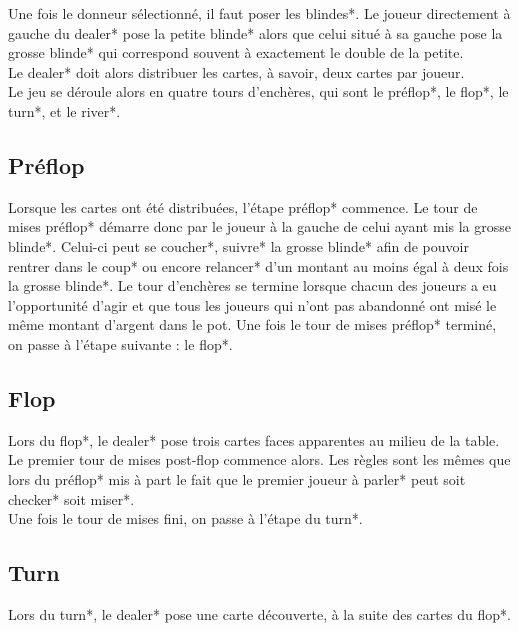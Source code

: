 \documentclass{report}
\begin{document}
Une fois le donneur sélectionné, il faut poser les blindes*. Le joueur directement à gauche du dealer* pose la petite blinde* alors que celui situé à sa gauche pose la grosse blinde* qui correspond souvent à exactement le double de la petite.\\

Le dealer* doit alors distribuer les cartes, à savoir, deux cartes par joueur. \\

Le jeu se déroule alors en quatre tours d'enchères, qui sont le préflop*, le flop*, le turn*, et le river*.\par

\subsection{Préflop}
\hspace{0.5cm}Lorsque les cartes ont été distribuées, l'étape préflop* commence. Le tour de mises préflop* démarre donc par le joueur à la gauche de celui ayant mis la grosse blinde*. Celui-ci peut se coucher*, suivre* la grosse blinde* afin de pouvoir rentrer dans le coup* ou encore relancer* d'un montant au moins égal à deux fois la grosse blinde*. Le tour d'enchères se termine lorsque chacun des joueurs a eu l'opportunité d'agir et que tous les joueurs qui n'ont pas abandonné ont misé le même montant d'argent dans le pot. Une fois le tour de mises préflop* terminé, on passe à l'étape suivante : le flop*.\par

\subsection{Flop}
\hspace{0.5cm}Lors du flop*, le dealer* pose trois cartes faces apparentes au milieu de la table. Le premier tour de mises post-flop commence alors. Les règles sont les mêmes que lors du préflop* mis à part le fait que le premier joueur à parler* peut soit checker* soit miser*.\\

Une fois le tour de mises fini, on passe à l'étape du turn*.\par
\subsection{Turn}
\hspace{0.5cm}Lors du turn*, le dealer* pose une carte découverte, à la suite des cartes du flop*. \\
\end{document}
